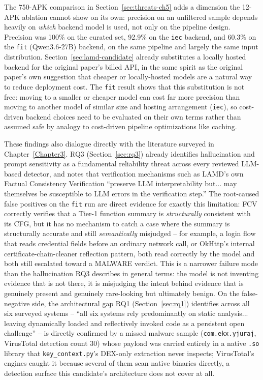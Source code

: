 The 750-APK comparison in Section~\ref{sec:threats-ch5} adds a dimension
the 12-APK ablation cannot show on its own: precision on an unfiltered
sample depends heavily on \emph{which} backend model is used, not only on
the pipeline design. Precision was 100\% on the curated set, 92.9\% on the
\texttt{iec} backend, and 60.3\% on the \texttt{fit}
(Qwen3.6-27B) backend, on the same pipeline and largely the same input
distribution. Section~\ref{sec:lamd-candidate} already substitutes a
locally hosted backend for the original paper's billed API, in the same
spirit as the original paper's own suggestion that cheaper or
locally-hosted models are a natural way to reduce deployment cost. The
\texttt{fit} result shows that this substitution is not free: moving to a
smaller or cheaper model can cost far more precision than moving to
another model of similar size and hosting arrangement (\texttt{iec}), so
cost-driven backend choices need to be evaluated on their own terms rather
than assumed safe by analogy to cost-driven pipeline optimizations like
caching.

These findings also dialogue directly with the literature surveyed in
Chapter~\ref{Chapter3}. RQ3 (Section~\ref{sec:rq3}) already identifies
hallucination and prompt sensitivity as a fundamental reliability threat
across every reviewed LLM-based detector, and notes that verification
mechanisms such as LAMD's own Factual Consistency Verification ``preserve
LLM interpretability but... may themselves be susceptible to LLM errors in
the verification step.'' The root-caused false positives on the
\texttt{fit} run are direct evidence for exactly this limitation: FCV
correctly verifies that a Tier-1 function summary is \emph{structurally}
consistent with its CFG, but it has no mechanism to catch a case where the
summary is structurally accurate and still \emph{semantically}
misjudged -- for example, a login flow that reads credential fields before
an ordinary network call, or OkHttp's internal certificate-chain-cleaner
reflection pattern, both read correctly by the model and both still
escalated toward a MALWARE verdict. This is a narrower failure mode than
the hallucination RQ3 describes in general terms: the model is not
inventing evidence that is not there, it is misjudging the intent behind
evidence that is genuinely present and genuinely rare-looking but
ultimately benign. On the false-negative side, the architectural gap RQ1
(Section~\ref{sec:rq1}) identifies across all six surveyed systems --
``all six systems rely predominantly on static analysis... leaving
dynamically loaded and reflectively invoked code as a persistent open
challenge'' -- is directly confirmed by a missed malware sample
(\texttt{com.ekx.yjuraj}, VirusTotal detection count 30) whose payload was
carried entirely in a native \texttt{.so} library that
\texttt{key\_context.py}'s DEX-only extraction never inspects; VirusTotal's
engines caught it because several of them scan native binaries directly, a
detection surface this candidate's architecture does not cover at all.

